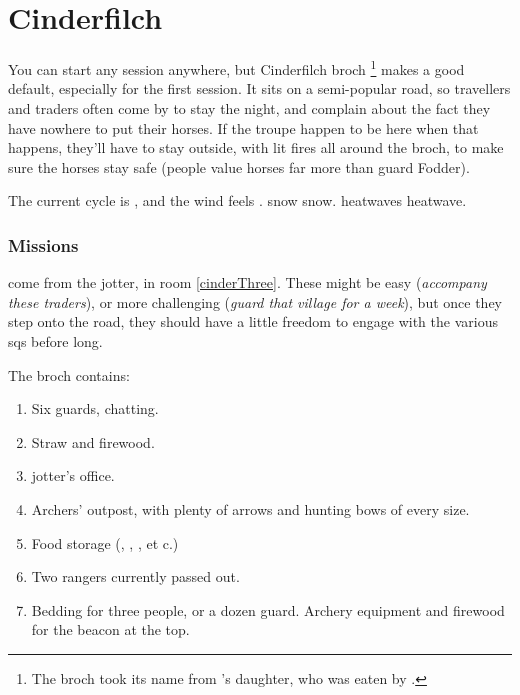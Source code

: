 \section{Cinderfilch }
\label{cinderfilch}



\begin{multicols}{2}

\noindent
You can start any session anywhere, but Cinderfilch \gls{broch}%
\footnote{The \gls{broch} took its name from 's daughter, who was eaten by .}
makes a good default, especially for the first session.
It sits on a semi-popular road, so travellers and traders often come by to stay the night, and complain about the fact they have nowhere to put their horses.
If the troupe happen to be here when that happens, they'll have to stay outside, with lit fires all around the \gls{broch}, to make sure the horses stay safe (people value horses far more than \gls{guard} Fodder).

The current \gls{cycle} is \showCycle, and the wind feels \showTemperature.
\ifcase\value{temperature}%
  \Gls{snow} \glsdesc{snow}.
\or%
\or%
\else%
  \Glspl{heatwave} \glsdesc{heatwave}.
\fi%

\subsubsection{Missions}
come from the \gls{jotter}, in room \ref{cinderThree}.%
These might be easy (\textit{accompany these traders}), or more challenging (\textit{guard that \gls{village} for a week}), but once they step onto the road, they should have a little freedom to engage with the various \glspl{sq} before long.

The \gls{broch} contains:

\begin{enumerate}
  \item
  Six \glspl{guard}, chatting.
  \label{cinderOne}
  \item
  Straw and firewood.
  \label{cinderTwo}
  \item
  \Gls{jotter}'s office.
  \label{cinderThree}
  \item
  Archers' outpost, with plenty of arrows and hunting bows of every size.
  \label{cinderFour}
  \item
  Food storage (\rations, \rations, \rations, et c.)
  \label{cinderFiveSide}
  \item
  Two \glspl{ranger} currently passed out.
  \label{cinderFive}
  \item
  Bedding for three people, or a dozen \gls{guard}.
  Archery equipment and firewood for the beacon at the top.
  \label{cinderSix}
\end{enumerate}

\end{multicols}
